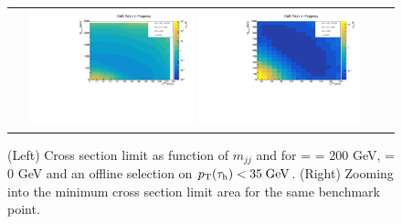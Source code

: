 \begin{figure}[tbh!]
	\centering
	\begin{tabular}{cc}
		\includegraphics[width=0.45\textwidth]{analysis/pics/JetInvMass_vs_MET_xsec_chi200_lsp000_taupt35.pdf}
		\includegraphics[width=0.45\textwidth]{analysis/pics/JetInvMass_vs_MET_xsec_chi200_lsp000_taupt35_zoom.pdf}
	\end{tabular}
	\caption{(Left) Cross section limit as function of $m_{jj}$ and \met for \charginopm = \neutralinotwo = 200 GeV, \neutralinoone = 0 GeV and an offline selection on $p_{\text{T}}(\tau_{\text{h}}) <  35\;\text{Ge}\kern-0.06667em\text{V}$. (Right) Zooming into the minimum cross section limit area for the same benchmark point.}
	\label{fig::JetInvMass_vs_MET_xsec_chi200_lsp000_taupt35}
\end{figure}

